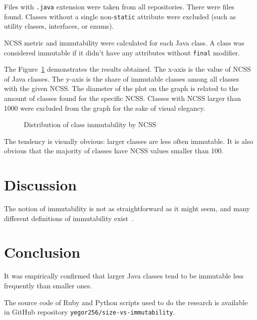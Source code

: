 \documentclass[12pt]{article}
\begin{document}
Files with \texttt{.java} extension were taken from all repositories.
There were \totaljavafiles{} files found. Classes without a single
non-\texttt{static} attribute were excluded (such as utility classes,
interfaces, or enums).

NCSS metric and immutability were calculated for each Java class.
A class was considered immutable if it didn't have any
attributes without \texttt{final} modifier.

The Figure~\ref{fig:1} demonstrates the results obtained. The x-axis is
the value of NCSS of Java classes. The y-axis is the share of immutable classes among
all classes with the given NCSS. The diameter of the plot on the graph
is related to the amount of classes found for the specific NCSS. Classes
with NCSS larger than 1000 were excluded from the graph for the sake of
visual elegancy.

\begin{figure}[h]
  
  \caption{Distribution of class immutability by NCSS}
  \label{fig:1}
\end{figure}

The tendency is visually obvious: larger classes are less often immutable. It
is also obvious that the majority of classes have NCSS values smaller than 100.

\section{Discussion}

The notion of immutability is not as straightforward as it might seem, and many
different definitions of immutability exist~\cite{potanin2013}.

\section{Conclusion}

It was empirically confirmed that larger Java classes tend to be immutable
less frequently than smaller ones.

The source code of Ruby and Python scripts used to do the research
is available in GitHub repository \texttt{yegor256/size-vs-immutability}.


\end{document}

